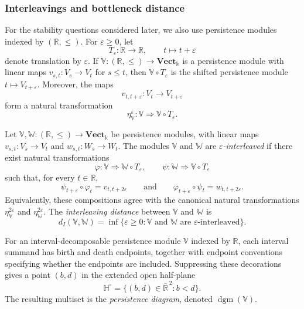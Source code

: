 \documentclass[a4paper,11pt]{article}
\theoremstyle{definition}
\theoremstyle{remark}
\begin{document}
\subsubsection*{Interleavings and bottleneck distance}

For the stability questions considered later, we also use persistence modules indexed by $(\mathbb{R},\leq)$. For $\varepsilon\geq 0$, let
$$ T_\varepsilon\colon \mathbb{R}\longrightarrow\mathbb{R},\qquad t\longmapsto t+\varepsilon $$
denote translation by $\varepsilon$. If $\mathbb{V}\colon(\mathbb{R},\leq)\longrightarrow\mathbf{Vect}_{\Bbbk}$ is a persistence module with linear maps $v_{s,t}\colon V_s\longrightarrow V_t$ for $s\leq t$, then $\mathbb{V}\circ T_\varepsilon$ is the shifted persistence module $t\mapsto V_{t+\varepsilon}$. Moreover, the maps
$$ v_{t,t+\varepsilon}\colon V_t\longrightarrow V_{t+\varepsilon} $$
form a natural transformation
$$ \eta_{\mathbb{V}}^\varepsilon\colon\mathbb{V}\Longrightarrow\mathbb{V}\circ T_\varepsilon. $$

Let $\mathbb{V},\mathbb{W}\colon(\mathbb{R},\leq)\longrightarrow\mathbf{Vect}_{\Bbbk}$ be persistence modules, with linear maps $v_{s,t}\colon V_s\longrightarrow V_t$ and $w_{s,t}\colon W_s\longrightarrow W_t$. The modules $\mathbb{V}$ and $\mathbb{W}$ are \emph{$\varepsilon$-interleaved} if there exist natural transformations
$$ \varphi\colon\mathbb{V}\Longrightarrow\mathbb{W}\circ T_\varepsilon,\qquad \psi\colon\mathbb{W}\Longrightarrow\mathbb{V}\circ T_\varepsilon $$
such that, for every $t\in\mathbb{R}$,
$$ \psi_{t+\varepsilon}\circ\varphi_t=v_{t,t+2\varepsilon}\qquad\text{and}\qquad \varphi_{t+\varepsilon}\circ\psi_t=w_{t,t+2\varepsilon}. $$
Equivalently, these compositions agree with the canonical natural transformations $\eta_{\mathbb{V}}^{2\varepsilon}$ and $\eta_{\mathbb{W}}^{2\varepsilon}$. The \emph{interleaving distance} between $\mathbb{V}$ and $\mathbb{W}$ is
$$ d_I(\mathbb{V},\mathbb{W})=\inf\{\varepsilon\geq 0\colon \mathbb{V}\text{ and }\mathbb{W}\text{ are }\varepsilon\text{-interleaved}\}. $$

For an interval-decomposable persistence module $\mathbb V$ indexed by $\mathbb R$, each interval summand has birth and death endpoints, together with endpoint conventions specifying whether the endpoints are included. Suppressing these decorations gives a point $(b,d)$ in the extended open half-plane
$$
\mathbb H^\circ = \{(b,d)\in\overline{\mathbb R}^{\,2}\colon b<d\}.
$$
The resulting multiset is the \emph{persistence diagram}, denoted $\operatorname{dgm}(\mathbb V)$.
\end{document}
